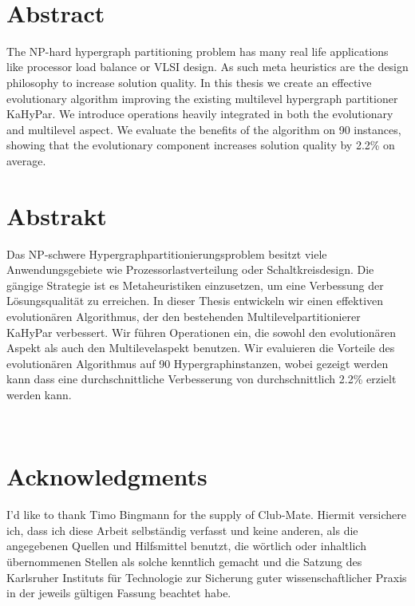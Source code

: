 \documentclass[a4paper,12pt,titlepage, BCOR7mm,headsepline]{scrbook}
\numberwithin{equation}{section}
\begin{document}

\ 
\newpage
\clearpage

\section*{Abstract}
The NP-hard hypergraph partitioning problem has many real life applications like processor load balance or VLSI design. As such meta heuristics are the design philosophy to increase solution quality. In this thesis we create an effective evolutionary algorithm 
improving the existing multilevel hypergraph partitioner KaHyPar. We introduce operations heavily integrated in both the evolutionary and multilevel aspect. We evaluate the benefits of the algorithm on 90 instances, showing that the evolutionary component increases solution quality by 2.2\% on average.



\section*{Abstrakt}
Das NP-schwere Hypergraphpartitionierungsproblem besitzt viele Anwendungsgebiete wie Prozessorlastverteilung oder Schaltkreisdesign. Die gängige Strategie ist es Metaheuristiken einzusetzen, um eine Verbessung der Lösungsqualität zu erreichen. In dieser Thesis entwickeln wir einen effektiven evolutionären Algorithmus, der den bestehenden Multilevelpartitionierer KaHyPar verbessert. Wir führen Operationen ein, die sowohl den evolutionären Aspekt als auch den Multilevelaspekt benutzen. Wir evaluieren die Vorteile des evolutionären Algorithmus auf 90 Hypergraphinstanzen, wobei gezeigt werden kann dass eine durchschnittliche Verbesserung von durchschnittlich 2.2\% erzielt werden kann.




\vfill\vfill\vfill
\ 
\newpage
\clearpage
\ 
\newpage
\clearpage

\section*{Acknowledgments}

I'd like to thank Timo Bingmann for the supply of Club-Mate.
\vfill\vfill\vfill
Hiermit versichere ich, dass ich diese Arbeit selbständig verfasst und keine anderen, als die angegebenen Quellen und Hilfsmittel benutzt, die wörtlich oder inhaltlich übernommenen Stellen als solche kenntlich gemacht und die Satzung des Karlsruher Instituts für Technologie zur Sicherung guter wissenschaftlicher Praxis in der jeweils gültigen Fassung beachtet habe.
\end{document}
